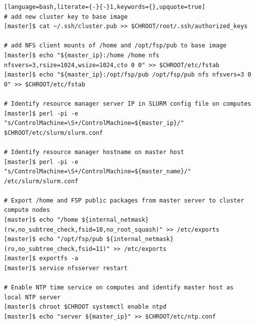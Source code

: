 \documentclass[letterpaper]{article}
\begin{document}
\begin{lstlisting}[language=bash,literate={-}{-}1,keywords={},upquote=true]
# add new cluster key to base image
[master]$ cat ~/.ssh/cluster.pub >> $CHROOT/root/.ssh/authorized_keys

# add NFS client mounts of /home and /opt/fsp/pub to base image
[master]$ echo "${master_ip}:/home /home nfs nfsvers=3,rsize=1024,wsize=1024,cto 0 0" >> $CHROOT/etc/fstab
[master]$ echo "${master_ip}:/opt/fsp/pub /opt/fsp/pub nfs nfsvers=3 0 0" >> $CHROOT/etc/fstab

# Identify resource manager server IP in SLURM config file on computes
[master]$ perl -pi -e "s/ControlMachine=\S+/ControlMachine=${master_ip}/" $CHROOT/etc/slurm/slurm.conf

# Identify resource manager hostname on master host
[master]$ perl -pi -e "s/ControlMachine=\S+/ControlMachine=${master_name}/" /etc/slurm/slurm.conf

# Export /home and FSP public packages from master server to cluster compute nodes
[master]$ echo "/home ${internal_netmask}(rw,no_subtree_check,fsid=10,no_root_squash)" >> /etc/exports
[master]$ echo "/opt/fsp/pub ${internal_netmask}(ro,no_subtree_check,fsid=11)" >> /etc/exports
[master]$ exportfs -a
[master]$ service nfsserver restart

# Enable NTP time service on computes and identify master host as local NTP server
[master]$ chroot $CHROOT systemctl enable ntpd
[master]$ echo "server ${master_ip}" >> $CHROOT/etc/ntp.conf
\end{lstlisting}



\end{document}
